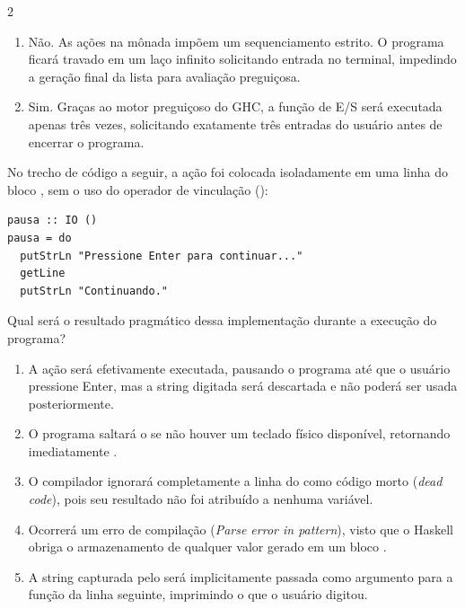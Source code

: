 \documentclass[a4paper,10pt,brazil]{article}
\begin{document}
\begin{multicols}{2}
\begin{enumerate}
  \item Não. As ações na mônada  impõem um sequenciamento estrito. O programa ficará travado em um laço infinito solicitando entrada no terminal, impedindo a geração final da lista para avaliação preguiçosa.

  \item Sim. Graças ao motor preguiçoso do GHC, a função de E/S será executada apenas três vezes, solicitando exatamente três entradas do usuário antes de encerrar o programa.


\end{enumerate}

No trecho de código a seguir, a ação  foi colocada isoladamente em uma linha do bloco , sem o uso do operador de vinculação (\haskellinline{<-}):

\begin{verbatim}
pausa :: IO ()
pausa = do
  putStrLn "Pressione Enter para continuar..."
  getLine
  putStrLn "Continuando."
\end{verbatim}

Qual será o resultado pragmático dessa implementação durante a execução do programa?

\begin{enumerate}
  \item A ação  será efetivamente executada, pausando o programa até que o usuário pressione Enter, mas a string digitada será descartada e não poderá ser usada posteriormente.

  \item O programa saltará o  se não houver um teclado físico disponível, retornando imediatamente .

  \item O compilador ignorará completamente a linha do  como código morto (\emph{dead code}), pois seu resultado não foi atribuído a nenhuma variável.

  \item Ocorrerá um erro de compilação (\emph{Parse error in pattern}), visto que o Haskell obriga o armazenamento de qualquer valor gerado em um bloco .

  \item A string capturada pelo  será implicitamente passada como argumento para a função  da linha seguinte, imprimindo o que o usuário digitou.



\end{enumerate}
\end{multicols}
\end{document}
